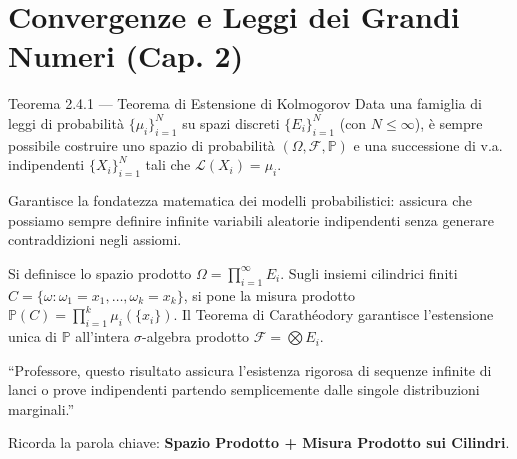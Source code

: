 \documentclass[11pt,a4paper]{report}
\begin{document}
\newpage

\chapter{Convergenze e Leggi dei Grandi Numeri (Cap. 2)}

\begin{teoremabox}{Teorema 2.4.1 --- Teorema di Estensione di Kolmogorov}
Data una famiglia di leggi di probabilità $\{\mu_i\}_{i=1}^N$ su spazi discreti $\{E_i\}_{i=1}^N$ (con $N \le \infty$), è sempre possibile costruire uno spazio di probabilità $(\Omega, \mathcal{F}, \mathbb{P})$ e una successione di v.a. indipendenti $\{X_i\}_{i=1}^N$ tali che $\mathcal{L}(X_i) = \mu_i$.

\begin{cosafa}
Garantisce la fondatezza matematica dei modelli probabilistici: assicura che possiamo sempre definire infinite variabili aleatorie indipendenti senza generare contraddizioni negli assiomi.
\end{cosafa}

\begin{dimostrazione}
Si definisce lo spazio prodotto $\Omega = \prod_{i=1}^\infty E_i$. Sugli insiemi cilindrici finiti $C = \{ \omega : \omega_1 = x_1, \dots, \omega_k = x_k \}$, si pone la misura prodotto $\mathbb{P}(C) = \prod_{i=1}^k \mu_i(\{x_i\})$. Il Teorema di Carathéodory garantisce l'estensione unica di $\mathbb{P}$ all'intera $\sigma$-algebra prodotto $\mathcal{F} = \bigotimes E_i$.
\end{dimostrazione}

\begin{oralbox}
``Professore, questo risultato assicura l'esistenza rigorosa di sequenze infinite di lanci o prove indipendenti partendo semplicemente dalle singole distribuzioni marginali.''
\end{oralbox}

\begin{tipbox}
Ricorda la parola chiave: \textbf{Spazio Prodotto + Misura Prodotto sui Cilindri}.
\end{tipbox}
\end{teoremabox}

\vspace{0.3cm}
\end{document}

